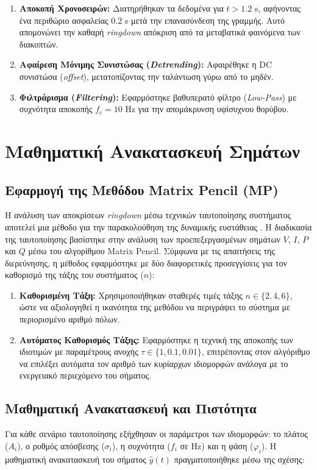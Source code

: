 \documentclass[conference]{IEEEtran}
\begin{document}
\begin{enumerate}
    \item \textbf{Αποκοπή Χρονοσειρών:} Διατηρήθηκαν τα δεδομένα για $t > 1.2$ s, αφήνοντας ένα περιθώριο ασφαλείας $0.2$ s μετά την επανασύνδεση της γραμμής. Αυτό απομονώνει την καθαρή \textit{ringdown} απόκριση από τα μεταβατικά φαινόμενα των διακοπτών.
    \item \textbf{Αφαίρεση Μόνιμης Συνιστώσας (\textit{Detrending}):} Αφαιρέθηκε η DC συνιστώσα (\textit{offset}), μετατοπίζοντας την ταλάντωση γύρω από το μηδέν.
    \item \textbf{Φιλτράρισμα (\textit{Filtering}):} Εφαρμόστηκε βα\-θυ\-πε\-ρα\-τό φίλτρο (\textit{Low-Pass}) με συχνότητα αποκοπής $f_{c} = 10$ Hz για την απομάκρυνση υψίσυχνου θορύβου.
\end{enumerate}
\section{Μαθηματική Ανακατασκευή Σημάτων}

\subsection{Εφαρμογή της Μεθόδου Matrix Pencil (MP)}
Η ανάλυση των αποκρίσεων \textit{ringdown} μέσω τεχνικών ταυτοποίησης συστήματος αποτελεί μια μέθοδο για την παρακολούθηση της δυναμικής ευστάθειας \cite{modal2018}. Η διαδικασία της ταυτοποίησης βασίστηκε στην ανάλυση των προεπεξεργασμένων σημάτων $V$, $I$, $P$ και $Q$ μέσω του αλγορίθμου Matrix Pencil. Σύμφωνα με τις απαιτήσεις της διερεύνησης, η μέθοδος εφαρμόστηκε με δύο διαφορετικές προσεγγίσεις για τον καθορισμό της τάξης του συστήματος ($n$):

\begin{enumerate}
    \item \textbf{Καθορισμένη Τάξη:} Χρησιμοποιήθηκαν σταθερές τιμές τάξης $n \in \{2, 4, 6\}$, ώστε να αξιολογηθεί η ικανότητα της μεθόδου να περιγράψει το σύστημα με περιορισμένο αριθμό πόλων.
    \item \textbf{Αυτόματος Καθορισμός Τάξης:} Εφαρμόστηκε η τεχνική της αποκοπής των ιδιοτιμών με παραμέτρους ανοχής $\tau \in \{1, 0.1, 0.01\}$, ε\-πι\-τρέ\-πο\-ντας στον αλγόριθμο να επιλέξει αυτόματα τον αριθμό των κυρίαρχων ιδιομορφών ανάλογα με το ενεργειακό περιεχόμενο του σήματος.
\end{enumerate}

\subsection{Μαθηματική Ανακατασκευή και Πιστότητα}
Για κάθε σενάριο ταυτοποίησης εξήχθησαν οι παράμετροι των ιδιομορφών: το πλάτος ($A_{i}$), ο ρυθμός απόσβεσης ($\sigma_{i}$), η συχνότητα ($f_{i}$ σε Hz) και η φάση ($\varphi_{i}$). Η μαθηματική ανακατασκευή του σήματος $\hat{y}(t)$ πραγματοποιήθηκε μέσω της σχέσης:
\end{document}
